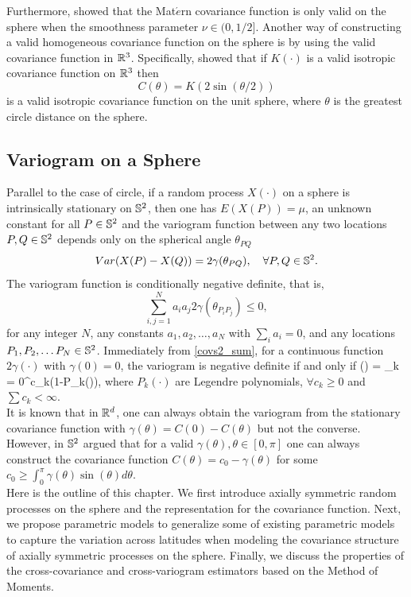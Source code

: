 Furthermore, \cite{Gneiting2013} showed that the Mat$\acute{e}$rn covariance function is only valid on the sphere when the smoothness parameter $\nu\in(0,1/2]$. Another way of constructing a valid homogeneous covariance function on the sphere is by using the valid covariance function in $\mathbb{R}^3$. Specifically, \cite{Yadrenko1983} showed that if $K(\cdot)$ is a valid isotropic covariance function on $\mathbb{R}^3$ then
\[
	C(\theta) = K(2\sin(\theta/2))
\]
is a valid isotropic covariance function on the unit sphere, where $\theta$ is the greatest circle distance on the sphere.
			
		\subsection{Variogram on a Sphere}
			
Parallel to the case of circle, if a random process $X(\cdot)$ on a sphere is intrinsically stationary on $\mathbb{S}^2$, then one has $E(X(P))=\mu$, an unknown constant for all $P\in \mathbb{S}^2$ and the variogram function between any two locations $P, Q \in \mathbb{S}^2$ depends only on the spherical angle $\theta_{PQ}$	
		\[
			Var(X(P)-X(Q)) = 2\gamma(\theta_{PQ}), \quad \forall P, Q \in \mathbb{S}^2.
		\]
		The variogram function is conditionally negative definite, that is,
		\[
			\sum_{i,j=1}^{N} a_i a_j 2\gamma(\theta_{P_iP_j}) \le 0,
		\]
for any integer $N$, any constants $a_1, a_2, \ldots, a_N$ with $\sum_i a_i = 0$, and any locations $P_1, P_2, \ldots P_N \in \mathbb{S}^2$. Immediately from \eqref{covs2_sum}, for a continuous function $2\gamma(\cdot)$ with $\gamma(0)=0$, the variogram is negative definite if and only if
		\beq
		\gamma(\theta) = \sum_{k = 0}^\infty c_k(1-P_k(\cos\theta)), \quad \theta \in [0,\pi]
		\eeq
where $P_{k}(\cdot)$ are Legendre polynomials, $\forall c_k\ge 0$ and $\sum c_k < \infty$. \\
			
It is known that in $\mathbb{R}^d$, one can always obtain the variogram from the stationary covariance function with $\gamma(\theta) = C(0) - C(\theta)$ but not the converse. However, in $\mathbb{S}^2$ \cite{Yaglom1961} argued that for a valid $\gamma(\theta), \theta \in [0,\pi]$ one can always construct the covariance function $C(\theta)=c_0-\gamma(\theta)$ for some $c_0 \ge \int_0^{\pi} \gamma(\theta)\sin(\theta)d\theta$. \\
			
Here is the outline of this chapter. We first introduce axially symmetric random processes on the sphere and the representation for the covariance function. Next, we propose parametric models to generalize some of existing parametric models to capture the variation across latitudes when modeling the covariance structure of axially symmetric processes on the sphere. Finally, we discuss the properties of the cross-covariance and cross-variogram estimators based on the Method of Moments.
		
